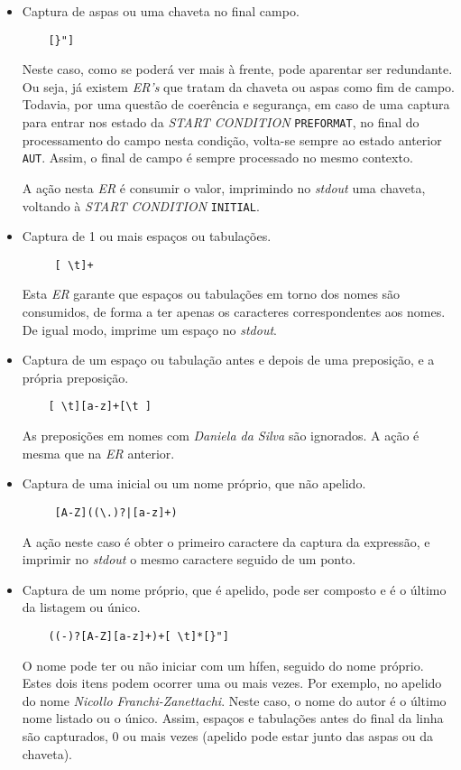 \begin{itemize}
  \item Captura de aspas ou uma chaveta no final campo.
		\begin{verbatim}  
    [}"]
    \end{verbatim}
    Neste caso, como se poderá ver mais à frente, pode aparentar ser redundante.
    Ou seja, já existem \emph{ER's} que tratam da chaveta ou aspas como fim de
    campo.  Todavia, por uma questão de coerência e segurança, em caso de uma
    captura para entrar nos estado da \emph{START CONDITION} \texttt{PREFORMAT},
    no final do processamento do campo nesta condição, volta-se sempre ao estado
    anterior \texttt{AUT}. Assim, o final de campo é sempre processado no mesmo
    contexto.

    A ação nesta \emph{ER} é consumir o valor, imprimindo no \emph{stdout} uma
    chaveta, voltando à \emph{START CONDITION} \texttt{INITIAL}.

  \item Captura de 1 ou mais espaços ou tabulações.
		\begin{verbatim}  
     [ \t]+
    \end{verbatim}

     Esta \emph{ER} garante que espaços ou tabulações em torno dos nomes são
     consumidos, de forma a ter apenas os caracteres correspondentes aos nomes.
     De igual modo, imprime um espaço no \emph{stdout}.
  
   \item Captura de um espaço ou tabulação antes e depois de uma
     preposição, e a própria preposição.
		\begin{verbatim}  
    [ \t][a-z]+[\t ]
    \end{verbatim}


     As preposições em nomes com \emph{Daniela da Silva} são ignorados.
     A ação é mesma que na \emph{ER} anterior.

   \item Captura de uma inicial ou um nome próprio, que não apelido.
    \begin{verbatim}
     [A-Z]((\.)?|[a-z]+)
    \end{verbatim}

  A ação neste caso é obter o primeiro caractere da captura da expressão,
  e imprimir no \emph{stdout} o mesmo caractere seguido de um ponto.


   \item Captura de um nome próprio, que é apelido, pode ser composto
     e é o último da listagem ou único.
    \begin{verbatim}
    ((-)?[A-Z][a-z]+)+[ \t]*[}"]
    \end{verbatim}
 O nome pode ter ou não iniciar com um hífen, seguido do nome próprio. Estes
 dois itens podem ocorrer uma ou mais vezes. Por exemplo, no apelido do nome
 \emph{Nicollo Franchi-Zanettachi}. Neste caso, o nome do autor é o último nome
 listado ou o único. Assim, espaços e tabulações antes do final da linha são
 capturados, 0 ou mais vezes (apelido pode estar junto das aspas ou da chaveta).


\end{itemize}
